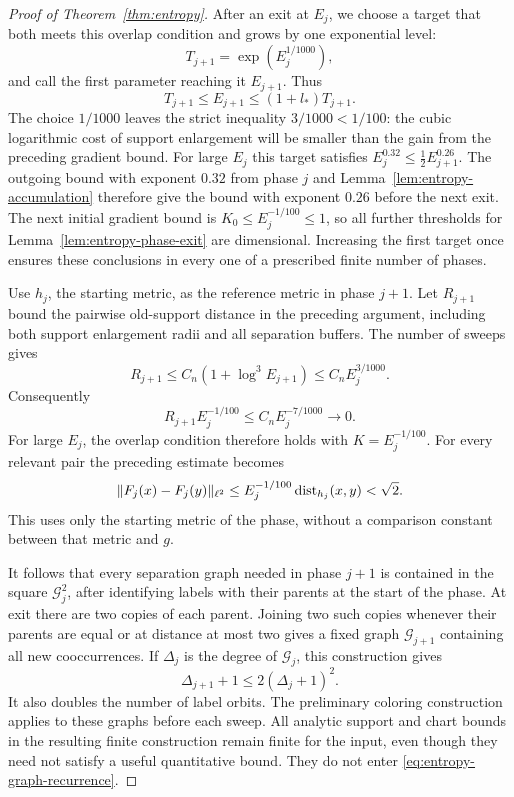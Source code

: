 \begin{proof}[Proof of Theorem~\ref{thm:entropy}]
After an exit at \(E_j\), we choose a target that both meets this
overlap condition and grows by one exponential level:
\begin{equation}\label{eq:entropy-phase-targets}
 T_{j+1}=\exp(E_j^{1/1000}),
\end{equation}
and call the first parameter reaching it \(E_{j+1}\).  Thus
\[
 T_{j+1}\leq E_{j+1}\leq(1+l_*)T_{j+1}.
\]
The choice \(1/1000\) leaves the strict inequality
\(3/1000<1/100\): the cubic logarithmic cost of support enlargement
will be smaller than the gain from the preceding gradient bound.
For large \(E_j\) this target satisfies
\(E_j^{0.32}\leq\tfrac12 E_{j+1}^{0.26}\).  The outgoing bound with
exponent \(0.32\) from phase \(j\) and
Lemma~\ref{lem:entropy-accumulation} therefore give the bound with
exponent \(0.26\) before the next exit.  The next initial gradient
bound is \(K_0\leq E_j^{-1/100}\leq1\), so all further thresholds
for Lemma~\ref{lem:entropy-phase-exit} are dimensional.  Increasing
the first target once ensures these conclusions in every one of a
prescribed finite number of phases.

Use \(h_j\), the starting metric, as the reference metric in phase
\(j+1\).  Let \(R_{j+1}\) bound the pairwise old-support distance in
the preceding argument, including both support enlargement radii and
all separation buffers.  The number of sweeps gives
\[
 R_{j+1}\leq C_n(1+\log^3 E_{j+1})
          \leq C_n E_j^{3/1000}.
\]
Consequently
\begin{equation}\label{eq:entropy-overlap-radius}
 R_{j+1}E_j^{-1/100}\leq C_n E_j^{-7/1000}\longrightarrow0.
\end{equation}
For large \(E_j\), the overlap condition therefore holds with
\(K=E_j^{-1/100}\).  For every relevant pair the preceding estimate
becomes
\[
 \|F_j(x)-F_j(y)\|_{\ell^2}
 \leq E_j^{-1/100}\operatorname{dist}_{h_j}(x,y)<\sqrt2.
\]
This uses only the starting metric of the phase, without a comparison
constant between that metric and \(g\).

It follows that every separation graph needed in phase \(j+1\) is
contained in the square \(\mathcal G_j^2\), after identifying labels
with their parents at the start of the phase.  At exit there are two
copies of each parent.  Joining two such copies whenever their parents
are equal or at distance at most two gives a fixed graph
\(\mathcal G_{j+1}\) containing all new cooccurrences.  If
\(\Delta_j\) is the degree of \(\mathcal G_j\), this construction gives
\begin{equation}\label{eq:entropy-graph-recurrence}
 \Delta_{j+1}+1\leq2(\Delta_j+1)^2.
\end{equation}
It also doubles the number of label orbits.  The preliminary coloring
construction applies to these graphs before each sweep.
All analytic support and chart bounds in the resulting finite
construction remain finite for the input, even though they need
not satisfy a useful quantitative bound.  They do not enter
\eqref{eq:entropy-graph-recurrence}.


\end{proof}
